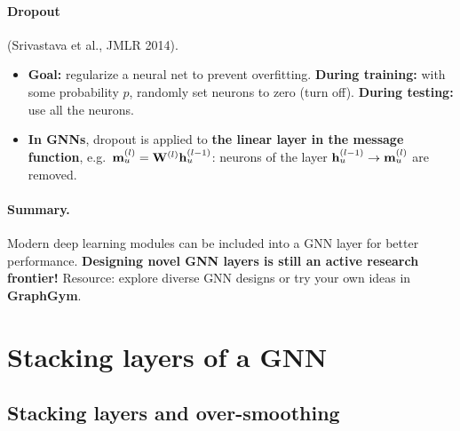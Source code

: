 \paragraph{Dropout} (Srivastava et al., JMLR 2014).
\begin{itemize}
  \item \textbf{Goal:} regularize a neural net to prevent overfitting.
    \textbf{During training:} with some probability $p$, randomly set neurons to
    zero (turn off). \textbf{During testing:} use all the neurons.
  \item \textbf{In GNNs}, dropout is applied to \textbf{the linear layer in the
    message function}, e.g.\ $\mathbf{m}_u^{(l)}=\mathbf{W}^{(l)}\mathbf{h}_u^{(l-1)}$: neurons of the
    layer $\mathbf{h}_u^{(l-1)}\to\mathbf{m}_u^{(l)}$ are removed.
\end{itemize}

\paragraph{Summary.} Modern deep learning modules can be included into a GNN
layer for better performance. \textbf{Designing novel GNN layers is still an
active research frontier!} Resource: explore diverse GNN designs or try your own
ideas in \textbf{GraphGym}.

\section{Stacking layers of a GNN}\label{sec:lec04-stack}

\subsection{Stacking layers and over-smoothing}\label{sec:lec04-oversmooth}

